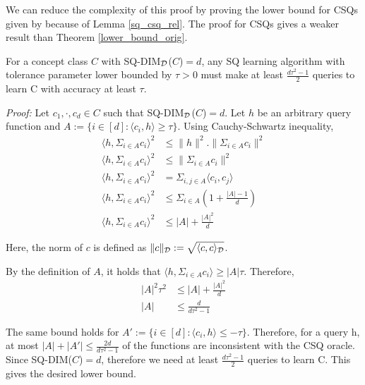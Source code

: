 We can reduce the complexity of this proof by proving the lower bound for CSQs given by \textbf{\cite{gavalda_characterizing_2009}} because of Lemma \ref{sq_csq_rel}. The proof for CSQs gives a weaker result than Theorem \ref{lower_bound_orig}.

\begin{theorem}
\label{lower_bound_csq}
For a concept class $C$ with SQ-DIM$_{\mathcal{D}}$($C$)$ = d$, any SQ learning algorithm with tolerance parameter lower bounded by $\tau > 0$ must make at least $\frac{d\tau^2-1}{2}$ queries to learn C with accuracy at least $\tau$.
\end{theorem}

\textit{Proof:} Let $c_1, \cdot, c_d \in C$ such that SQ-DIM$_{\mathcal{D}}$($C$)$ = d$. Let $h$ be an arbitrary query function and $A := \{i \in [d]: \langle c_i, h \rangle \geq \tau\}$. Using Cauchy-Schwartz inequality,
\begin{align*}
    \langle h, \Sigma_{i \in A} c_i \rangle^2 &\leq \lVert h \rVert^2.\lVert \Sigma_{i \in A} c_i \rVert^2 \\
    \langle h, \Sigma_{i \in A} c_i \rangle^2 &\leq \lVert \Sigma_{i \in A} c_i \rVert^2 \\
    \langle h, \Sigma_{i \in A} c_i \rangle^2 &= \Sigma_{i,j \in A} \langle c_i, c_j \rangle \\
    \langle h, \Sigma_{i \in A} c_i \rangle^2 &\leq \Sigma_{i \in A} \left(1+\frac{|A|-1}{d}\right) \\
    \langle h, \Sigma_{i \in A} c_i \rangle^2 &\leq |A| + \frac{|A|^2}{d}
\end{align*}

Here, the norm of $c$ is defined as $\lVert c \rVert_{\mathcal{D}} := \sqrt{\langle c, c \rangle_{\mathcal{D}}}$. 

By the definition of $A$, it holds that $\langle h, \Sigma_{i \in A} c_i \rangle \geq |A|\tau$. Therefore,
\begin{align*}
    |A|^2\tau^2 &\leq |A| + \frac{|A|^2}{d} \\
    |A| &\leq \frac{d}{d\tau^2 - 1}
\end{align*}

The same bound holds for $A' := \{i \in [d]: \langle c_i, h \rangle \leq -\tau\}$. Therefore, for a query h, at most $|A| + |A'| \leq \frac{2d}{d\tau^2-1}$ of the functions are inconsistent with the CSQ oracle. Since SQ-DIM($C$)$ = d$, therefore we need at least $\frac{d\tau^2-1}{2}$ queries to learn C. This gives the desired lower bound.

